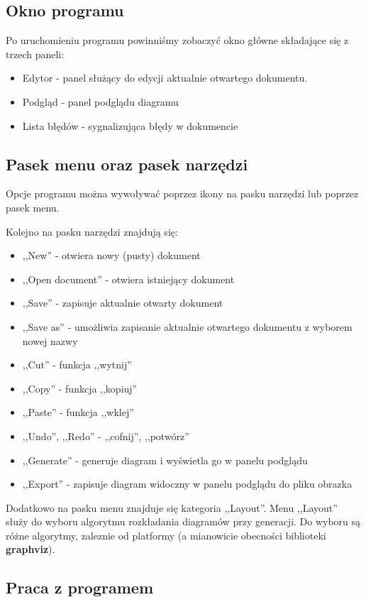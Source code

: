 \subsection{Okno programu}
Po uruchomieniu programu powinniśmy zobaczyć okno główne składające się z trzech paneli:

\begin{itemize}
	\item Edytor - panel służący do edycji aktualnie otwartego dokumentu.
	\item Podgląd - panel podglądu diagramu
	\item Lista błędów - sygnalizująca błędy w dokumencie
\end{itemize}

\subsection{Pasek menu oraz pasek narzędzi}
Opcje programu można wywoływać poprzez ikony na pasku narzędzi lub poprzez pasek menu.

Kolejno na pasku narzędzi znajdują się:
\begin{itemize}
	\item ,,New'' - otwiera nowy (pusty) dokument
	\item ,,Open document'' - otwiera istniejący dokument
	\item ,,Save'' - zapisuje aktualnie otwarty dokument
	\item ,,Save as'' - umożliwia zapisanie aktualnie otwartego dokumentu z wyborem nowej nazwy
	\item ,,Cut'' - funkcja ,,wytnij''
	\item ,,Copy'' - funkcja ,,kopiuj''
	\item ,,Paste'' - funkcja ,,wklej''
	\item ,,Undo'', ,,Redo'' - ,,cofnij'', ,,potwórz''
	\item ,,Generate'' - generuje diagram i wyświetla go w panelu podglądu
	\item ,,Export'' - zapisuje diagram widoczny w panelu podglądu do pliku obrazka
\end{itemize}

Dodatkowo na pasku menu znajduje się kategoria ,,Layout''. Menu ,,Layout'' służy do wyboru algorytmu rozkładania diagramów przy generacji. Do wyboru są różne algorytmy, zaleznie od platformy (a mianowicie obecności biblioteki \textbf{graphviz}).

\subsection{Praca z programem}

